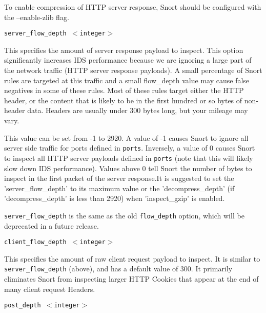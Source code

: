 \documentclass[english]{report}
\newcounter{slistnum}
\newenvironment{slist}
{ \begin{list}{ {\bf \arabic{slistnum}.} }{\usecounter{slistnum} } }
{ \end{list} }
\newenvironment{note}{
\samepage
    \vspace{10pt}{\textsf{
        {\hspace{7pt}\Huge{$\triangle$\hspace{-12.5pt}{\Large{$^!$}}}}\hspace{5pt}
        {\Large{NOTE}}
    }
    }
   \begin{center}
    \par\vspace{-17pt}

    \begin{lrbox}{\savepar}
    \begin{minipage}[r]{6in}
}
{
    \end{minipage}
    \end{lrbox}
    \fbox{
        \usebox{
            \savepar
	}
    }
    \par\vskip10pt
    \end{center}
}
\newenvironment{note}{
        \begin{rawhtml}
        <p><table border="1"><tr><td><b>
        Note:&nbsp;&nbsp;</b>
        \end{rawhtml}
}{
        \begin{rawhtml}
        </b></td></tr></table></p>
        \end{rawhtml}
}
\begin{document}
\begin{slist}
\begin{note}

To enable compression of HTTP server response, Snort should be configured
with the --enable-zlib flag.

\end{note}

\item \texttt{server\_flow\_depth $<$integer$>$}

This specifies the amount of server response payload to inspect.  This option
significantly increases IDS performance because we are ignoring a large part of
the network traffic (HTTP server response payloads).  A small percentage of
Snort rules are targeted at this traffic and a small flow\_depth value may
cause false negatives in some of these rules.  Most of these rules target
either the HTTP header, or the content that is likely to be in the first
hundred or so bytes of non-header data.  Headers are usually under 300 bytes
long, but your mileage may vary.

This value can be set from -1 to 2920. A value of -1 causes Snort to ignore all
server side traffic for ports defined in \texttt{ports}.  Inversely, a value of
0 causes Snort to inspect all HTTP server payloads defined in \texttt{ports}
(note that this will likely slow down IDS performance).  Values above 0 tell
Snort the number of bytes to inspect in the first packet of the server
response.It is suggested to set the 'server\_flow\_depth' to its maximum value or 
the 'decompress\_depth' (if 'decompress\_depth' is less than 2920) when 'inspect\_gzip' 
is enabled.

\begin{note}

\texttt{server\_flow\_depth} is the same as the old \texttt{flow\_depth}
option, which will be deprecated in a future release.

\end{note}

\item \texttt{client\_flow\_depth $<$integer$>$}

This specifies the amount of raw client request payload to inspect.  It is
similar to \texttt{server\_flow\_depth} (above), and has a default value of
300.  It primarily eliminates Snort from inspecting larger HTTP Cookies that
appear at the end of many client request Headers.

\item \texttt{post\_depth $<$integer$>$}


\end{slist}
\end{document}
